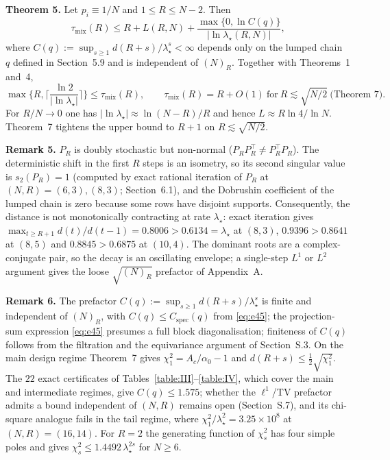 \documentclass[twoside,11pt]{article}
\begin{document}
\textbf{Theorem 5.} Let $p_i\equiv1/N$ and $1\leq R\leq N-2$. Then
\begin{equation}\label{eq:e28}
\tau_{\mathrm{mix}}(R)\leq R+L(R,N)+\dfrac{\max\{0,\ln C(q)\}}{|\ln\lambda_\star(R,N)|},
\end{equation}
where $C(q):=\sup_{s\geq1}d(R+s)/\lambda_\star^s<\infty$ depends only on the lumped chain~$q$ defined in
Section~5.9 and is independent of $(N)_R$. Together with Theorems~1 and~4,
\begin{equation}\label{eq:e29}
\max\Big\{R,\Big\lceil\dfrac{\ln2}{|\ln\lambda_\star|}\Big\rceil\Big\}\leq\tau_{\mathrm{mix}}(R),\qquad \tau_{\mathrm{mix}}(R)=R+O(1)\ \text{for}\ R\lesssim\sqrt{N/2}\ \text{(Theorem~7)}.
\end{equation}
For $R/N\to0$ one has $|\ln\lambda_\star|\approx\ln(N-R)/R$ and hence
$L\approx R\ln4/\ln N$. Theorem~7 tightens the upper bound to $R+1$ on
$R\lesssim\sqrt{N/2}$.
\label{thm:mix-upper}

\textbf{Remark 5.}
$P_R$ is doubly stochastic but non-normal ($P_RP_R^{\top}\neq P_R^{\top}P_R$). The deterministic shift in the
first $R$ steps is an isometry, so its second singular value is
$s_2(P_R)=1$ (computed by exact rational iteration of $P_R$ at $(N,R)=(6,3),(8,3)$; Section~6.1), and the Dobrushin
coefficient of the lumped chain is zero because some rows have disjoint
supports. Consequently, the distance is not monotonically contracting at rate
$\lambda_\star$: exact iteration gives
$\max_{t\geq R+1}d(t)/d(t-1)=0.8006>0.6134=\lambda_\star$ at $(8,3)$,
$0.9396>0.8641$ at $(8,5)$ and $0.8845>0.6875$ at $(10,4)$. The dominant
roots are a complex-conjugate pair, so the decay is an oscillating envelope;
a single-step $L^1$ or $L^2$ argument gives the loose
$\sqrt{(N)_R}$ prefactor of Appendix~A.

\textbf{Remark 6.} The prefactor $C(q):=\sup_{s\geq1}d(R+s)/\lambda_\star^s$ is finite and independent of $(N)_R$, with $C(q)\le C_{\mathrm{spec}}(q)$ from \eqref{eq:e45}; the projection-sum expression \eqref{eq:e45} presumes a full block diagonalisation; finiteness of $C(q)$ follows from the filtration and the equivariance argument of Section~S.3. On the main design regime Theorem~7 gives $\chi^2_1=A_c/\alpha_0-1$ and $d(R+s)\le\tfrac12\sqrt{\chi^2_1}$. The $22$ exact certificates of Tables~\ref{table:III}--\ref{table:IV}, which cover the main and intermediate regimes, give $C(q)\le1.575$; whether the $\ell^1$/TV prefactor admits a bound independent of $(N,R)$ remains open (Section~S.7), and its chi-square analogue fails in the tail regime, where $\chi^2_1/\lambda_\star^2=3.25\times10^8$ at $(N,R)=(16,14)$. For $R=2$ the generating function of $\chi^2_s$ has four simple poles and gives $\chi^2_s\le1.4492\,\lambda_\star^{2s}$ for $N\geq6$.
\end{document}
